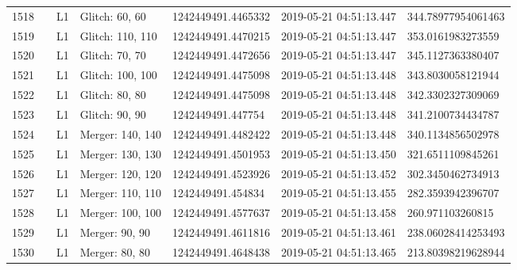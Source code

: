 \begin{longtable}{lllllll}
1518 &                                                    &       L1 &    Glitch: 60, 60 &  1242449491.4465332 &  2019-05-21 04:51:13.447 &  344.78977954061463 \\
1519 &                                                    &       L1 &  Glitch: 110, 110 &  1242449491.4470215 &  2019-05-21 04:51:13.447 &   353.0161983273559 \\
1520 &                                                    &       L1 &    Glitch: 70, 70 &  1242449491.4472656 &  2019-05-21 04:51:13.447 &   345.1127363380407 \\
1521 &                                                    &       L1 &  Glitch: 100, 100 &  1242449491.4475098 &  2019-05-21 04:51:13.448 &   343.8030058121944 \\
1522 &                                                    &       L1 &    Glitch: 80, 80 &  1242449491.4475098 &  2019-05-21 04:51:13.448 &   342.3302327309069 \\
1523 &                                                    &       L1 &    Glitch: 90, 90 &   1242449491.447754 &  2019-05-21 04:51:13.448 &   341.2100734434787 \\
1524 &                                                    &       L1 &  Merger: 140, 140 &  1242449491.4482422 &  2019-05-21 04:51:13.448 &   340.1134856502978 \\
1525 &                                                    &       L1 &  Merger: 130, 130 &  1242449491.4501953 &  2019-05-21 04:51:13.450 &   321.6511109845261 \\
1526 &                                                    &       L1 &  Merger: 120, 120 &  1242449491.4523926 &  2019-05-21 04:51:13.452 &   302.3450462734913 \\
1527 &                                                    &       L1 &  Merger: 110, 110 &   1242449491.454834 &  2019-05-21 04:51:13.455 &   282.3593942396707 \\
1528 &                                                    &       L1 &  Merger: 100, 100 &  1242449491.4577637 &  2019-05-21 04:51:13.458 &    260.971103260815 \\
1529 &                                                    &       L1 &    Merger: 90, 90 &  1242449491.4611816 &  2019-05-21 04:51:13.461 &  238.06028414253493 \\
1530 &                                                    &       L1 &    Merger: 80, 80 &  1242449491.4648438 &  2019-05-21 04:51:13.465 &  213.80398219628944 \\

\end{longtable}
